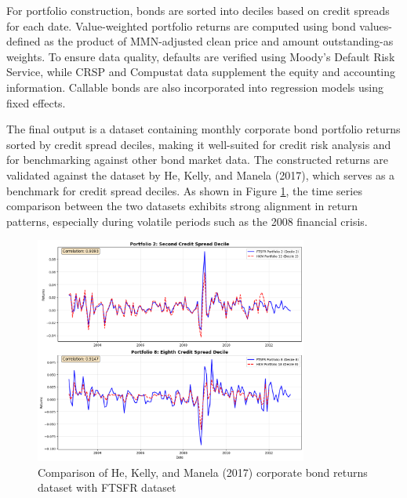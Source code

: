 \documentclass{article}
\begin{document}
\begin{appendices}
For portfolio construction, bonds are sorted into deciles based on credit spreads for each date. Value-weighted portfolio returns are computed using bond values-defined as the product of MMN-adjusted clean price and amount outstanding-as weights. To ensure data quality, defaults are verified using Moody's Default Risk Service, while CRSP and Compustat data supplement the equity and accounting information. Callable bonds are also incorporated into regression models using fixed effects.

The final output is a dataset containing monthly corporate bond portfolio returns sorted by credit spread deciles, making it well-suited for credit risk analysis and for benchmarking against other bond market data. The constructed returns are validated against the dataset by He, Kelly, and Manela (2017), which serves as a benchmark for credit spread deciles. As shown in Figure \ref{fig:corp_bond_returns_comparison}, the time series comparison between the two datasets exhibits strong alignment in return patterns, especially during volatile periods such as the 2008 financial crisis.

\begin{figure}[h]
    \centering
    \includegraphics[width=0.8\textwidth]{../docs_src/corporate_returns_compare.png}
    \caption{Comparison of He, Kelly, and Manela (2017) corporate bond returns dataset with FTSFR dataset}
    \label{fig:corp_bond_returns_comparison}
  \end{figure}



\end{appendices}
\end{document}
